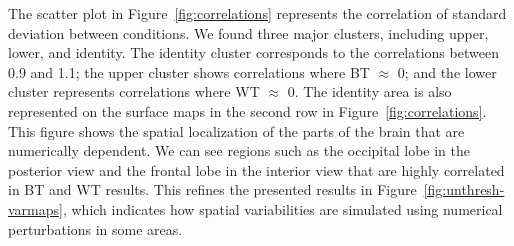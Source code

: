 \documentclass[runningheads]{llncs}
\begin{document}

The scatter plot in Figure~\ref{fig:correlations} represents the correlation of standard deviation between conditions.
We found three major clusters, including upper, lower, and identity.
The identity cluster corresponds to the correlations between 0.9 and 1.1; the upper cluster shows correlations where BT $\approx$ 0;
and the lower cluster represents correlations where WT $\approx$ 0.
The identity area is also represented on the surface maps in the second row in Figure~\ref{fig:correlations}.
This figure shows the spatial localization of the parts of the brain that are numerically dependent.
We can see regions such as the occipital lobe in the posterior view and the frontal lobe in the interior view 
that are highly correlated in BT and WT results.
This refines the presented results in Figure~\ref{fig:unthresh-varmaps},
which indicates how spatial variabilities are simulated using numerical perturbations in some areas.



\end{document}
